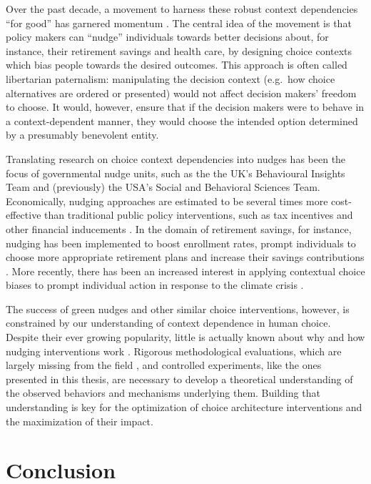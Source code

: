 \documentclass[a4paper, nobind]{templates/ociamthesis}
\begin{document}
Over the past decade, a movement to harness these robust context dependencies ``for good'' has garnered momentum \autocite{thaler2008}. The central idea of the movement is that policy makers can ``nudge'' individuals towards better decisions about, for instance, their retirement savings and health care, by designing choice contexts which bias people towards the desired outcomes. This approach is often called libertarian paternalism: manipulating the decision context (e.g.~how choice alternatives are ordered or presented) would not affect decision makers' freedom to choose. It would, however, ensure that if the decision makers were to behave in a context-dependent manner, they would choose the intended option determined by a presumably benevolent entity.

Translating research on choice context dependencies into nudges has been the focus of governmental nudge units, such as the the UK's Behavioural Insights Team and (previously) the USA's Social and Behavioral Sciences Team. Economically, nudging approaches are estimated to be several times more cost-effective than traditional public policy interventions, such as tax incentives and other financial inducements \autocite{benartzi2017}. In the domain of retirement savings, for instance, nudging has been implemented to boost enrollment rates, prompt individuals to choose more appropriate retirement plans and increase their savings contributions \autocite{benartzi2007,iyengar2010}. More recently, there has been an increased interest in applying contextual choice biases to prompt individual action in response to the climate crisis \autocite{schubert2017,zaneva2020,carlsson2021}.

The success of green nudges and other similar choice interventions, however, is constrained by our understanding of context dependence in human choice. Despite their ever growing popularity, little is actually known about why and how nudging interventions work \autocite{marteau2020}. Rigorous methodological evaluations, which are largely missing from the field \autocite{marchiori2017,vankleef2018}, and controlled experiments, like the ones presented in this thesis, are necessary to develop a theoretical understanding of the observed behaviors and mechanisms underlying them. Building that understanding is key for the optimization of choice architecture interventions and the maximization of their impact.

\hypertarget{conclusion-3}{%
\section{Conclusion}\label{conclusion-3}}
\end{document}
